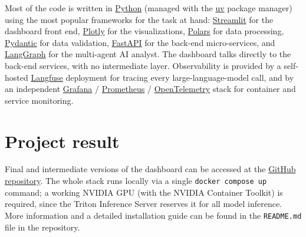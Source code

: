 \documentclass[a4paper,12pt]{article}
\begin{document}
Most of the code is written in \href{https://www.python.org/}{Python} (managed with the \href{https://docs.astral.sh/uv/}{uv} package manager) using the most popular frameworks for the task at hand: \href{https://streamlit.io/}{Streamlit} for the dashboard front end, \href{https://plotly.com/}{Plotly} for the visualizations, \href{https://pola.rs/}{Polars} for data processing, \href{https://pydantic.dev/}{Pydantic} for data validation, \href{https://fastapi.tiangolo.com/}{FastAPI} for the back-end micro-services, and \href{https://docs.langchain.com/oss/python/langgraph/overview}{LangGraph} for the multi-agent AI analyst.
The dashboard talks directly to the back-end services, with no intermediate layer.
Observability is provided by a self-hosted \href{https://langfuse.com/}{Langfuse} deployment for tracing every large-language-model call, and by an independent \href{https://grafana.com/}{Grafana} / \href{https://prometheus.io/}{Prometheus} / \href{https://opentelemetry.io/}{OpenTelemetry} stack for container and service monitoring.

\section{Project result}
Final and intermediate versions of the dashboard can be accessed at the \href{https://github.com/alexveider1/Ultimate-Macroeconomics-Dashboard}{GitHub repository}.
The whole stack runs locally via a single \texttt{docker compose up} command; a working NVIDIA GPU (with the NVIDIA Container Toolkit) is required, since the Triton Inference Server reserves it for all model inference.
More information and a detailed installation guide can be found in the \texttt{README.md} file in the repository.

\newpage{}

\tableofcontents{}
\end{document}
